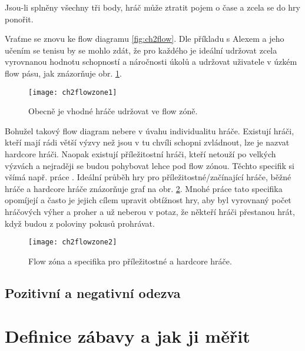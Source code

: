 Jsou-li splněny všechny tři body, hráč může ztratit pojem o čase a zcela se do hry ponořit.

Vraťme se znovu ke flow diagramu \ref{fig:ch2flow}. Dle příkladu s Alexem a jeho učením se tenisu by se mohlo zdát, že pro každého je ideální udržovat zcela vyrovnanou hodnotu schopností a náročnosti úkolů a udržovat uživatele v úzkém flow pásu, jak znázorňuje obr. \ref{fig:ch2flowzone1}.

\begin{figure}
  \centering
  \texttt{[image: ch2flowzone1]}
	\caption{Obecně je vhodné hráče udržovat ve flow zóně. \cite{thesisflow} }
	\label{fig:ch2flowzone1}
\end{figure}	

Bohužel takový flow diagram nebere v úvahu individualitu hráče. Existují hráči, kteří mají rádi větší výzvy než jsou v tu chvíli schopni zvládnout, lze je nazvat hardcore hráči. Naopak existují příležitostní hráči, kteří netouží po velkých výzvách a nejraději se budou pohybovat lehce pod flow zónou. Těchto specifik si všímá např. práce \cite{RiskTakers}. Ideální průběh hry pro příležitostné/začínající hráče, běžné hráče a hardcore hráče znázorňuje graf na obr. \ref{fig:ch2flowzone2}. Mnohé práce tato specifika opomíjejí a často je jejich cílem upravit obtížnost hry, aby byl vyrovnaný počet hráčových výher a proher a už neberou v potaz, že někteří hráči přestanou hrát, když budou z poloviny pokusů prohrávat.

\begin{figure}
  \centering
  \texttt{[image: ch2flowzone2]}
	\caption{Flow zóna a specifika pro příležitostné a hardcore hráče. \cite{thesisflow} }
	\label{fig:ch2flowzone2}
\end{figure}	

\subsection{Pozitivní a negativní odezva}

\section{Definice zábavy a jak ji měřit} \label{sec:defzab}



